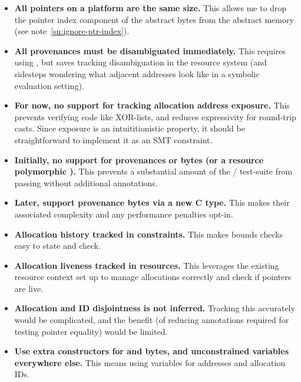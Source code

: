 \begin{itemize}
    \item \textbf{All pointers on a platform are the same size.} This
        allows me to drop the pointer index component of the abstract bytes
        from the abstract memory (see note~\ref{sn:ignore-ptr-index}).
    \item \textbf{All provenances must be disambiguated immediately.} This
        requires using , but saves tracking
        disambiguation in the resource system (and sidesteps wondering what
        adjacent addresses look like in a symbolic evaluation setting).
    \item \textbf{For now, no support for tracking allocation address
        exposure.} This prevents verifying code like XOR-lists, and reduces
        expressivity for round-trip casts. Since exposure is an
        intuititionistic property, it should be straightforward to
        implement it as an SMT constraint.
    \item \textbf{Initially, no support for provenances or bytes
        (or a resource polymorphic ).}
        This prevents a substantial amount of the /
        test-suite from passing without additional annotations.
    \item \textbf{Later, support provenance bytes via a new C type.} This makes
        their associated complexity and any performance penalties opt-in.
    \item \textbf{Allocation history tracked in constraints.} This makes
        bounds checks easy to state and check.
    \item \textbf{Allocation liveness tracked in resources.} This leverages the
        existing resource context set up to manage allocations correctly and
        check if pointers are live.
    \item \textbf{Allocation and ID disjointness is not inferred.} Tracking
        this accurately would be complicated, and the benefit (of reducing
        annotations required for testing pointer equality) would be limited.
    \item \textbf{Use extra constructors for  and
         bytes, and unconstrained variables everywhere
        else.} This means using variables for addresses and allocation IDs.
\end{itemize}
